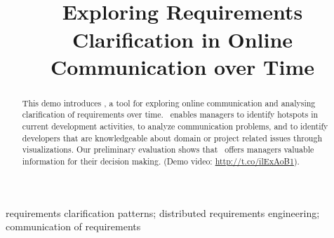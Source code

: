
\title{\viss\\Exploring Requirements Clarification in Online Communication over Time}


\author{
}

\maketitle


\begin{abstract}
This demo introduces \viss, a tool for exploring online communication and analysing clarification of requirements over time.
\viss\ enables managers to identify hotspots in current development activities, to analyze communication problems, and to identify developers that are knowledgeable about domain or project related issues through visualizations.
Our preliminary evaluation shows that \viss\ offers managers valuable information for their decision making.
(Demo video: \url{http://t.co/ilExAoB1}).
\end{abstract}

\begin{IEEEkeywords}
requirements clarification patterns; distributed requirements engineering; communication of requirements
\end{IEEEkeywords}
